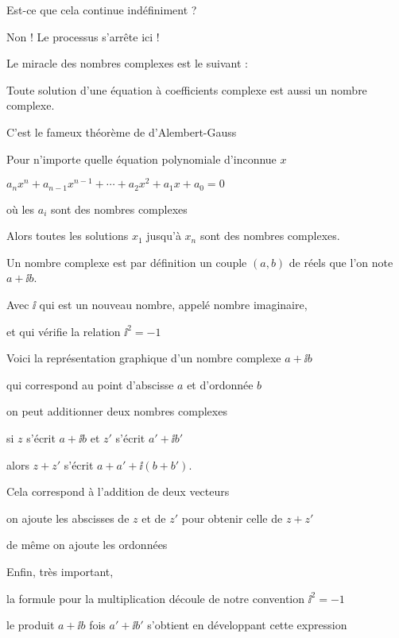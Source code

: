 Est-ce que cela continue indéfiniment ?

Non ! Le processus s'arrête ici !

Le miracle des nombres complexes est le suivant : 

Toute solution d'une équation à coefficients complexe
est aussi un nombre complexe.

\change

C'est le fameux théorème de d'Alembert-Gauss

Pour n'importe quelle équation polynomiale d'inconnue $x$

$a_nx^n+a_{n-1}x^{n-1}+\cdots + a_2 x^2 + a_1x+a_0=0$

où les $a_i$ sont des nombres complexes

Alors toutes les solutions $x_1$ jusqu’à $x_n$ sont des nombres complexes.


\diapo

Un nombre complexe est par définition un couple $(a,b)$ de réels
que l'on note $a+\ii b$.

\change

Avec $\ii$ qui est un nouveau nombre, appelé nombre imaginaire,


et qui vérifie la relation $\ii^2=-1$

\change

Voici la représentation graphique d'un nombre complexe $a+\ii b$

qui correspond au point d'abscisse $a$ et d'ordonnée $b$

\change

on peut additionner deux nombres complexes

si $z$ s'écrit $a+\ii b$ et $z'$ s'écrit $a'+\ii b'$

alors $z+z'$ s'écrit $a+a' + \ii (b+b')$.


\change

Cela correspond à l'addition de deux vecteurs

on ajoute les abscisses de $z$ et de $z'$
pour obtenir celle de $z+z'$

de même on ajoute les ordonnées

\change

Enfin, très important, 

la formule pour la multiplication découle de notre 
convention $\ii^2 = -1$

le produit $a+\ii b$ fois $a'+\ii b'$ s'obtient en développant cette
expression

